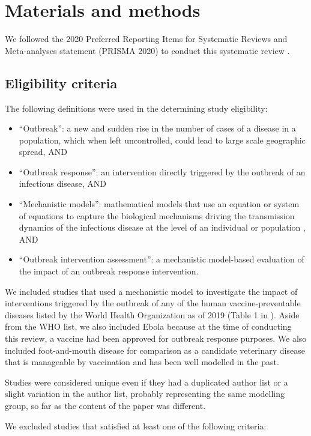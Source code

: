 \documentclass[10pt,letterpaper]{article}
\begin{document}
\section*{Materials and methods}
We followed the 2020 Preferred Reporting Items for Systematic Reviews and Meta-analyses statement (PRISMA 2020)  to conduct this systematic review \cite{Page2021}.

\subsection*{Eligibility criteria}
The following definitions were used in the determining study eligibility:

\begin{itemize}
	\item ``Outbreak'': a new and sudden rise in the number of cases of a disease in a population, which when left uncontrolled, could lead to large scale geographic spread, AND 
	\item ``Outbreak response'': an intervention directly triggered by the outbreak of an infectious disease, AND
	\item ``Mechanistic models'': mathematical models that use an equation or system of equations to capture the biological mechanisms driving the transmission dynamics of the infectious disease at the level of an individual or population \cite{Lessler2016a,Reiner2013}, AND
	\item ``Outbreak intervention assessment'': a mechanistic model-based evaluation of the impact of an outbreak response intervention.
\end{itemize}

We included studies that used a mechanistic model to investigate the impact of interventions triggered by the outbreak of any of the human vaccine-preventable diseases listed by the World Health Organization as of 2019 (Table 1 in ). Aside from the WHO list, we also included Ebola because at the time of conducting this review, a vaccine had been approved for outbreak response purposes. We also included foot-and-mouth disease for comparison as a candidate veterinary disease that is manageable by vaccination and has been well modelled in the past. 

Studies were considered unique even if they had a duplicated author list or a slight variation in the author list, probably representing the same modelling group, so far as the content of the paper was different. 


We excluded studies that satisfied at least one of the following criteria: 
\end{document}
